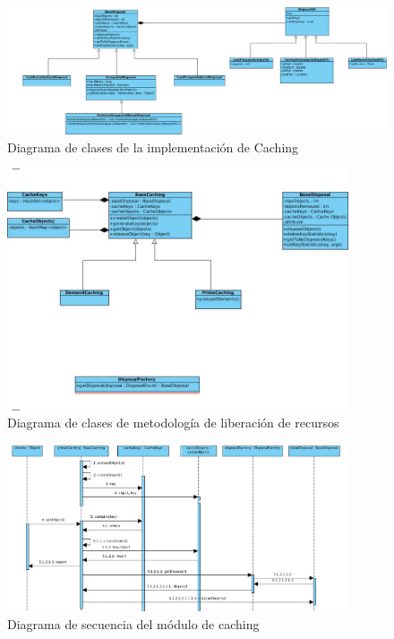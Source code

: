 \documentclass[12pt,a4paper,spanish,openany]{book}
\begin{document}
\begin{figure}
\begin{center}
 \includegraphics[width=1\textwidth]{./img/caching1.jpg}
\caption{Diagrama de clases de la implementación de Caching}
\end{center}
\end{figure}

\begin{figure}[ht]
\begin{center}
 \includegraphics[width=0.9\textwidth]{./img/caching2.jpg}
\caption{Diagrama de clases de metodología de liberación de recursos}
\end{center}
\end{figure}



\begin{figure}[ht]
\begin{center}
 \includegraphics[width=0.9\textwidth]{./img/caching3.jpg}
\caption{Diagrama de secuencia del módulo de caching}
\end{center}
\end{figure}
\end{document}
